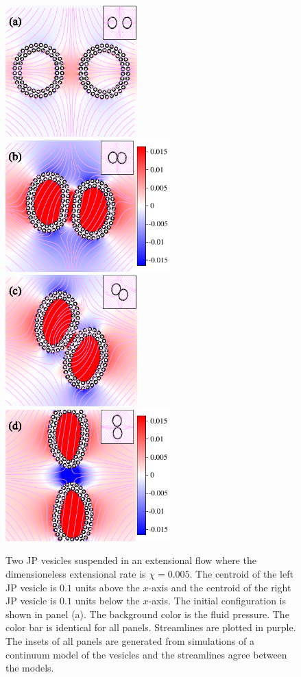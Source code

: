 \documentclass[lineno]{jfm}
\begin{document}
\begin{figure}
\centering
\includegraphics[height=2in]{N116_ext_0.pdf}
\includegraphics[height=2in]{N116_ext_2000.pdf}\\
\includegraphics[height=2in]{N116_ext_4000.pdf}
\includegraphics[height=2in]{N116_ext_6500.pdf}
  \caption{\label{figure12} Two JP vesicles suspended in an
  extensional flow where the dimensioneless extensional rate is
  $\chi=0.005$. The centroid of the left JP vesicle is $0.1$ units
  above the $x$-axis and the centroid of the right JP vesicle is
  $0.1$ units below the $x$-axis. The initial configuration is shown in
  panel (a). The background color is the fluid pressure. The color bar
  is identical for all panels. Streamlines are plotted in purple. The
  insets of all panels are generated from simulations of a continuum
  model of the vesicles and the streamlines agree between the models.}
\end{figure}
\end{document}
